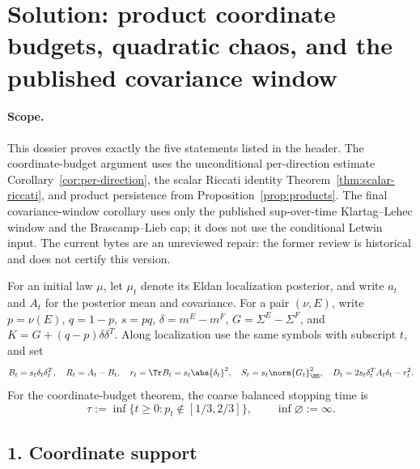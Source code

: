 \documentclass[../main.tex]{subfiles}
\begin{document}
%
\section*{Solution: product coordinate budgets, quadratic chaos,
and the published covariance window}
\label{sec:sol-kls-product-covariance}

\paragraph{Scope.}
This dossier proves exactly the five statements listed in the header.  The coordinate-budget
argument uses the unconditional per-direction estimate
Corollary~\ref{cor:per-direction}, the scalar Riccati identity
Theorem~\ref{thm:scalar-riccati}, and product persistence from
Proposition~\ref{prop:products}.  The final covariance-window corollary uses only the published
sup-over-time Klartag--Lehec window and the Brascamp--Lieb cap; it does not use the conditional
Letwin input.  The current bytes are an unreviewed repair: the former review is historical and
does not certify this version.

For an initial law $\mu$, let $\mu_t$ denote its Eldan localization posterior, and write
$a_t$ and $A_t$ for the posterior mean and covariance.  For a pair $(\nu,E)$, write
$p=\nu(E)$, $q=1-p$, $s=pq$,
$\delta=m^E-m^F$, $G=\Sigma^E-\Sigma^F$, and
$K=G+(q-p)\delta\delta^T$.  Along localization use the same symbols with subscript $t$, and set
\[
  B_t=s_t\delta_t\delta_t^T,
  \quad R_t=A_t-B_t,
  \quad r_t=\Tr B_t=s_t\abs{\delta_t}^2,
  \quad S_t=s_t\norm{G_t}_{\HS}^2,
  \quad D_t=2s_t\delta_t^TA_t\delta_t-r_t^2.
\]
For the coordinate-budget theorem, the coarse balanced stopping time is
\begin{equation}\label{eq:sol-product-tau}
  \tau:=\inf\{t\ge0:p_t\notin[1/3,2/3]\},
  \qquad \inf\varnothing:=\infty.
\end{equation}

\subsection*{1. Coordinate support}
\end{document}
